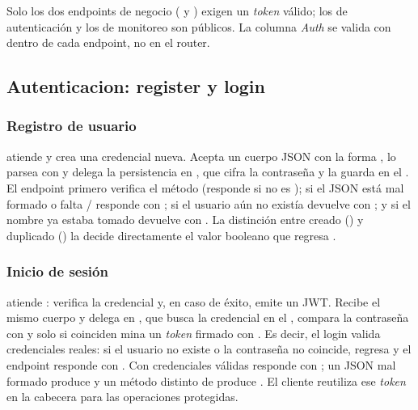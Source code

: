 Solo los dos endpoints de negocio ( y
) exigen un \emph{token} válido; los de
autenticación y los de monitoreo son públicos. La columna \emph{Auth} se valida
con  dentro de cada endpoint, no en el router.

\subsection{Autenticacion: register y login}

\subsubsection*{Registro de usuario}

 atiende  y crea una
credencial nueva. Acepta un cuerpo JSON con la forma
, lo parsea con  y
delega la persistencia en , que cifra la
contraseña y la guarda en el . El endpoint primero
verifica el método (responde  si no es ); si el JSON está
mal formado o falta / responde  con
; si el usuario aún no existía devuelve
 con ; y si el nombre ya estaba tomado
devuelve  con . La distinción
entre creado () y duplicado () la decide directamente el
valor booleano que regresa .

\subsubsection*{Inicio de sesión}

 atiende : verifica la
credencial y, en caso de éxito, emite un JWT. Recibe el mismo cuerpo
 y delega en
, que busca la credencial en el
, compara la contraseña con  y
solo si coinciden mina un \emph{token} firmado con . Es
decir, el login valida credenciales reales: si el usuario no existe o la
contraseña no coincide,  regresa  y el endpoint
responde  con . Con
credenciales válidas responde  con ; un
JSON mal formado produce  y un método distinto de 
produce . El cliente reutiliza ese \emph{token} en la cabecera
 para las operaciones protegidas.


